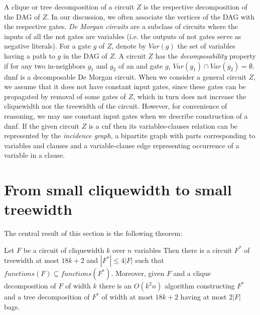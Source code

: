 \documentclass{llncs}
\begin{document}
A clique or tree decomposition of a circuit $Z$ is the respective decomposition of the 
DAG of $Z$. In our discussion, we often associate the vertices of the DAG with the respective gates.
\emph{De Morgan circuits} are a subclass of circuits where the inputs of all the {\sc not} gates are variables
(i.e. the outputs of {\sc not} gates serve as negative literals). For a gate $g$ of $Z$, denote by $Var(g)$
the set of variables having a path to $g$ in the DAG of $Z$. A circuit $Z$ has the \emph{decomposability} property
if for any two in-neighbors $g_1$ and $g_2$ of an {\sc and} gate $g$, $Var(g_1) \cap Var(g_2)=\emptyset$.
{\sc dnnf} is a decomposable De Morgan circuit. 
When we consider a general circuit $Z$, we assume that it does not
have constant input gates, since these gates can be propagated by removal of some gates of $Z$, which in turn
does not increase the cliquewidth nor the treewidth of the circuit. However, for convenience of reasoning, 
we may use constant input gates when we describe construction of a {\sc dnnf}. If the given circuit $Z$ is a {\sc cnf}
then its variables-clauses relation can be represented by the \emph{incidence graph}, 
a bipartite graph with parts corresponding to variables and clauses and a variable-clause
edge representing occurrence of a variable in a clause. 
\begin{comment}
A \emph{satisfying assignment} of a {\sc cnf} $F$ is a set $S$ of literals
such that each clause $C$ of $F$ contains at least one literal of $S$. We say that {\sc cnf}s $F_1$ and $F_2$ are \emph{equivalent}
if they have the same set of satisfying assignments. A \emph{projection} of a set $S$ of literals to a set $V$ of variables is
a subset $S'$ of $S$ consisting of all the literals whose variables belong to $V$. A {\sc cnf} $F_2$ is a projection of a {\sc cnf} $F_1$
to a set $V$ of variables if the following two conditions are true: (i) if $S$ is a satisfying assignment of $F_1$ then the projection
of $S$ to $V$ is a satisfying assignment of $F_2$ (ii) any satisfying assignment of $F_2$ can be extended to a satisfying assignment of 
$F_1$.
\end{comment}



\section{From small cliquewidth to small treewidth}
The central result of this section is the following theorem:

\begin{theorem} \label{finalwidth}
Let $F$ be a circuit of cliquewidth $k$ over $n$ variables
Then there is a circuit $F^*$ of treewidth at most $18k+2$ and $|F^*| \leq 4|F|$
such that $functions(F) \subseteq functions (F^*)$. Moreover, 
given $F$ and a clique decomposition of $F$ of width $k$ there is
an $O(k^2n)$ algorithm constructing $F^*$ and a tree decomposition of
$F^*$ of width at most $18k+2$ having at most $2|F|$ bags.
\end{theorem}
\end{document}
